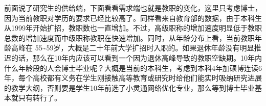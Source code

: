 \documentclass[]{tufte-book}
\newenvironment{Shaded}{}{}
\newcommand{\AttributeTok}[1]{\textcolor[rgb]{0.49,0.56,0.16}{#1}}
\newcommand{\CommentTok}[1]{\textcolor[rgb]{0.38,0.63,0.69}{\textit{#1}}}
\newcommand{\FunctionTok}[1]{\textcolor[rgb]{0.02,0.16,0.49}{#1}}
\newcommand{\NormalTok}[1]{#1}
\newcommand{\OtherTok}[1]{\textcolor[rgb]{0.00,0.44,0.13}{#1}}
\newcommand{\SpecialCharTok}[1]{\textcolor[rgb]{0.25,0.44,0.63}{#1}}
\newcommand{\StringTok}[1]{\textcolor[rgb]{0.25,0.44,0.63}{#1}}
\begin{document}
前面说了研究生的供给端，下面看看需求端也就是教职的变化，这里只考虑博士，因为当前教职对学历的要求已经比较高了。同样看来自教育部的数据，由于本科生从1999年开始扩招，教职数也一直增加。不过，高级职称的增加速度明显低于教职总数的增加速度而中级职称教职在快速增加。同时，从年龄分布上看，当前教职年龄高峰在 55\textasciitilde59岁，大概是二十年前大学扩招时入职的。如果退休年龄没有明显推迟的话，那么在10年内应该可以看到一个因为退休高峰导致的教职空缺期。10年内什么年龄段的人会博士毕业呢？大概是当前的本科生，考虑到本科4年加硕博连读6年，每个高校都有义务在学生刚接触高等教育或研究时给他们能实时吸纳研究进展的教学大纲，否则要是学生10年前选了小灵通网络优化专业，那么等到博士毕业基本就只有转行了。

\begin{Shaded}
\end{Shaded}
\end{document}

